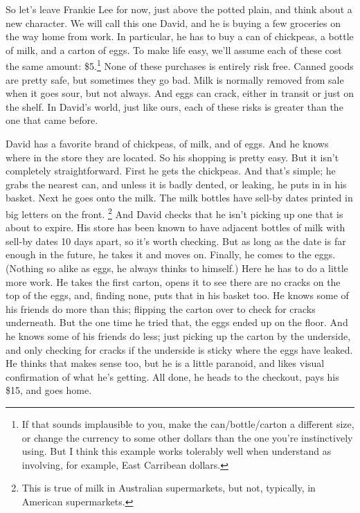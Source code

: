 \documentclass[
  11pt,
]{book}
\begin{document}
So let's leave Frankie Lee for now, just above the potted plain, and think about a new character. We will call this one David, and he is buying a few groceries on the way home from work. In particular, he has to buy a can of chickpeas, a bottle of milk, and a carton of eggs. To make life easy, we'll assume each of these cost the same amount: \$5.\footnote{If that sounds implausible to you, make the can/bottle/carton a different size, or change the currency to some other dollars than the one you're instinctively using. But I think this example works tolerably well when understand as involving, for example, East Carribean dollars.} None of these purchases is entirely risk free. Canned goods are pretty safe, but sometimes they go bad. Milk is normally removed from sale when it goes sour, but not always. And eggs can crack, either in transit or just on the shelf. In David's world, just like ours, each of these risks is greater than the one that came before.

David has a favorite brand of chickpeas, of milk, and of eggs. And he knows where in the store they are located. So his shopping is pretty easy. But it isn't completely straightforward. First he gets the chickpeas. And that's simple; he grabs the nearest can, and unless it is badly dented, or leaking, he puts in in his basket. Next he goes onto the milk. The milk bottles have sell-by dates printed in big letters on the front. \footnote{This is true of milk in Australian supermarkets, but not, typically, in American supermarkets.} And David checks that he isn't picking up one that is about to expire. His store has been known to have adjacent bottles of milk with sell-by dates 10 days apart, so it's worth checking. But as long as the date is far enough in the future, he takes it and moves on. Finally, he comes to the eggs. (Nothing so alike as eggs, he always thinks to himself.) Here he has to do a little more work. He takes the first carton, opens it to see there are no cracks on the top of the eggs, and, finding none, puts that in his basket too. He knows some of his friends do more than this; flipping the carton over to check for cracks underneath. But the one time he tried that, the eggs ended up on the floor. And he knows some of his friends do less; just picking up the carton by the underside, and only checking for cracks if the underside is sticky where the eggs have leaked. He thinks that makes sense too, but he is a little paranoid, and likes visual confirmation of what he's getting. All done, he heads to the checkout, pays his \$15, and goes home.
\end{document}

